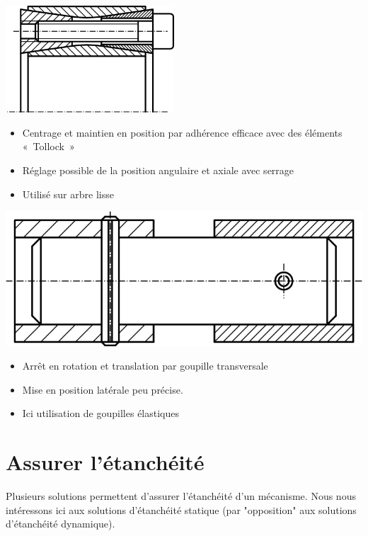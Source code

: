 \documentclass[11pt,oneside]{article}
\begin{document}
\noindent\begin{minipage}[c]{.45\linewidth}
 \begin{center}
  \includegraphics[height=4cm]{png/Fig14}
 \end{center}

\begin{itemize}
\item Centrage et maintien en position par adhérence efficace avec des éléments
«~Tollock~»
\item Réglage possible de la position angulaire et axiale avec serrage
\item Utilisé sur arbre lisse
\end{itemize} 
\end{minipage} \hfill
\noindent\begin{minipage}[c]{.45\linewidth}
 \begin{center}
  \includegraphics[width=.9\textwidth]{png/Fig9}
 \end{center}

\begin{itemize}
\item Arrêt en rotation et translation par goupille transversale
\item Mise en position latérale peu précise.
\item Ici utilisation de goupilles élastiques
\end{itemize}
\end{minipage} 



\section{Assurer l'étanchéité}
Plusieurs solutions permettent d'assurer l'étanchéité d'un mécanisme. Nous nous intéressons ici aux solutions d'étanchéité statique (par "opposition" aux solutions d'étanchéité dynamique).
\end{document}
